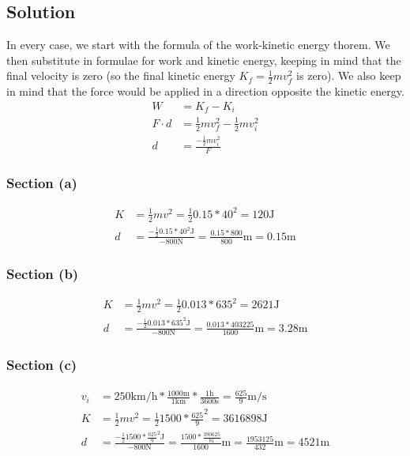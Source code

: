 \documentclass[12pt]{article}
\begin{document}
\subsection*{Solution}
In every case, we start with the formula of the work-kinetic energy thorem. We then substitute in formulae for work and kinetic energy, keeping in mind that the final velocity is zero (so the final kinetic energy $K_f = \frac{1}{2}mv_f^2$ is zero). We also keep in mind that the force would be applied in a direction opposite the kinetic energy.
\begin{align*}
    W   &= K_f - K_i\\
    F \cdot d   &= \frac{1}{2}mv_f^2 - \frac{1}{2}mv_i^2\\
    d   &= \frac{-\frac{1}{2}mv_i^2}{F}
\end{align*}

\subsubsection*{Section (a)}
\begin{align*}
    K   &= \frac{1}{2}mv^2 = \frac{1}{2} 0.15 * 40^2 = \boxed{120 \unit{\joule}}\\
    d   &= \frac{-\frac{1}{2}0.15*40^2 \unit{\joule}}{-800 \unit{\newton}}
        = \frac{0.15 * 800}{800} \unit{\meter} 
        = \boxed{0.15 \unit{\meter}}
\end{align*}

\subsubsection*{Section (b)}
\begin{align*}
    K   &= \frac{1}{2}mv^2 = \frac{1}{2} 0.013 * 635^2 = \boxed{2621 \unit{\joule}}\\
    d   &= \frac{-\frac{1}{2}0.013*635^2 \unit{\joule}}{-800 \unit{\newton}}
        = \frac{0.013 * 403225}{1600} \unit{\meter} 
        = \boxed{3.28 \unit{\meter}}
\end{align*}

\subsubsection*{Section (c)}
\begin{align*}
    v_i &= 250 \unit{\kilo\meter/\hour} * \frac{1000 \unit{\meter}}{1 \unit{\kilo\meter}} * \frac{1 \unit{\hour}}{3600 \unit{\second}} = \frac{625}{9} \unit{\meter/\second}\\
    K   &= \frac{1}{2}mv^2 = \frac{1}{2} 1500 * \frac{625}{9}^2 = \boxed{3616898 \unit{\joule}}\\
    d   &= \frac{-\frac{1}{2}1500*\frac{625}{9}^2 \unit{\joule}}{-800 \unit{\newton}}
        = \frac{1500*\frac{390625}{81}}{1600} \unit{\meter} 
        = \boxed{\frac{1953125}{432} \unit{\meter} = 4521 \unit{\meter}}
\end{align*}
\end{document}
